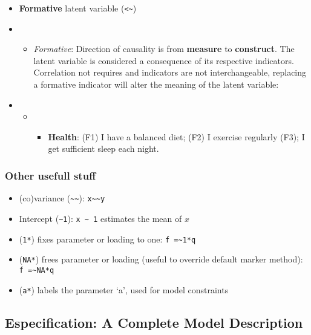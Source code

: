 \documentclass[
]{article}
\providecommand{\tightlist}{%
  \setlength{\itemsep}{0pt}\setlength{\parskip}{0pt}}
\begin{document}
\begin{itemize}
\item
  \textbf{Formative} latent variable
  (\texttt{\textless{}\textasciitilde{}})
\item
  \begin{itemize}
  \tightlist
  \item
    \emph{Formative}: Direction of causality is from \textbf{measure} to
    \textbf{construct}. The latent variable is considered a consequence
    of its respective indicators. Correlation not requires and
    indicators are not interchangeable, replacing a formative indicator
    will alter the meaning of the latent variable:
  \end{itemize}
\item
  \begin{itemize}
  \item
    \begin{itemize}
    \tightlist
    \item
      \textbf{Health}: (F1) I have a balanced diet; (F2) I exercise
      regularly (F3); I get sufficient sleep each night.
    \end{itemize}
  \end{itemize}
\end{itemize}

\hypertarget{other-usefull-stuff}{%
\subsubsection{Other usefull stuff}\label{other-usefull-stuff}}

\begin{itemize}
\item
  (co)variance (\texttt{\textasciitilde{}\textasciitilde{}}):
  \texttt{x\textasciitilde{}\textasciitilde{}y}
\item
  Intercept (\texttt{\textasciitilde{}1}):
  \texttt{x\ \textasciitilde{}\ 1} estimates the mean of \(x\)
\item
  (\texttt{1*}) fixes parameter or loading to one:
  \texttt{f\ =\textasciitilde{}1*q}
\item
  (\texttt{NA*}) frees parameter or loading (useful to override default
  marker method): \texttt{f\ =\textasciitilde{}NA*q}
\item
  (\texttt{a*}) labels the parameter `a', used for model constraints
\end{itemize}

\hypertarget{especification-a-complete-model-description}{%
\subsection{Especification: A Complete Model
Description}\label{especification-a-complete-model-description}}
\end{document}
